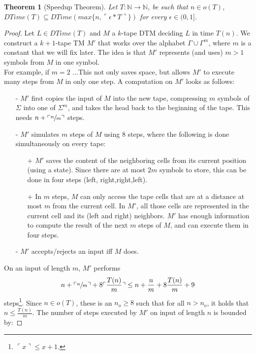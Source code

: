 \documentclass{report}
\newtheorem{theorem}[definition]{Theorem}
\begin{document}
\begin{theorem}[Speedup Theorem]\label{thm:speedup}
Let $T: \mathbb{N} \rightarrow \mathbb{N}$, be such that $n \in o(T)$, $DTime(T) \subseteq DTime(max\{n,\ulcorner \epsilon*T\urcorner\})$ for every $\epsilon \in (0,1]$.
\end{theorem}

\begin{proof} Let $L\in DTime(T)$ and $M$ a $k$-tape DTM deciding $L$ in time $T(n)$. We construct a $k+1$-tape TM $M'$ that works over the alphabet $\Gamma \cup \Gamma^m$, where $m$ is a constant that we will fix later. The idea is that $M'$  represents (and uses) $m>1$ symbols from $M$ in one symbol.\\
For example, if $m=2$ ...This not only saves space, but allows $M'$ to execute many steps from $M$ in only one step. A computation on $M'$ looks as follows:
\begin{itemize}
\item[-] $M'$ first copies the input of $M$ into the new tape, compressing $m$ symbols of $\Sigma$ into one of $\Sigma^m$, and takes the head back to the beginning of the tape. This needs $n+\ulcorner \sfrac{n}{m} \urcorner$ steps.
	\item[-] $M'$ simulates $m$ steps of $M$ using 8 steps, where the following is done simultaneously on every tape:
	\begin{itemize}
		\item[+] $M'$ saves the content of the neighboring cells from its current position (using a state). Since there are at most $2m$ symbols to store, this can be done in four steps (left, right,right,left).
		\item[+] In $m$ steps, $M$ can only access the tape cells that are at a distance at most $m$ from the current cell. In $M'$, all those cells are represented in the current cell and its (left and right) neighbors. $M'$ has enough information to compute the result of the next $m$ steps of $M$, and can execute them in four steps.
	\end{itemize}
	\item[-] $M'$ accepts/rejects an input iff $M$ does.
\end{itemize}
On an input of length $m$, $M'$ performs
\[n+\ulcorner \sfrac{n}{m} \urcorner + 8 \ulcorner\frac{T(n)}{m}\urcorner \leq n + \frac{n}{m} + 8 \frac{T(n)}{m}+9
\]
steps\footnote{$\ulcorner x \urcorner \leq x+1$.}. Since $n \in o(T)$, these is an $n_o \geq 8$ such that for all $n>n_o$, it holds that $n\leq\frac{T(n)}{m}$. The number of steps executed by $M'$ on input of length $n$ is bounded by:

\end{proof}
\end{document}

